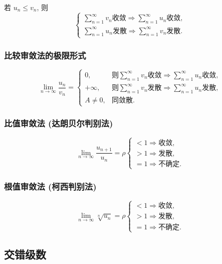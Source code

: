 若 $u_n \leq v_n$, 则
$$
    \begin{cases}
        \sum_{n=1}^\infty v_n \mbox{收敛} \Longrightarrow \sum_{n=1}^\infty u_n \mbox{收敛}, \\
        \sum_{n=1}^\infty u_n \mbox{发散} \Longrightarrow \sum_{n=1}^\infty v_n \mbox{发散}.
    \end{cases}
$$

\subsubsection{比较审敛法的极限形式}

$$
\lim _{n \to \infty} \frac{u_{n}}{v_{n}} =
    \begin{cases}
        0, & \mbox{则} \sum_{n=1}^\infty v_n \mbox{收敛} \Longrightarrow \sum_{n=1}^\infty u_n \mbox{收敛}, \\
        +\infty, & \mbox{则} \sum_{n=1}^\infty v_n \mbox{发散} \Longrightarrow \sum_{n=1}^\infty u_n \mbox{发散}, \\
        A \neq 0, & \mbox{同敛散}.
    \end{cases}
$$

\subsubsection{比值审敛法 (达朗贝尔判别法)}

$$
    \lim_{n\to\infty} \frac{u_{n+1}}{u_{n}} = \rho
    \begin{cases}
        < 1 \Longrightarrow \mbox{收敛}, \\
        > 1 \Longrightarrow \mbox{发散}, \\
        = 1 \Longrightarrow \mbox{不确定}.
    \end{cases}
$$

\subsubsection{根值审敛法 (柯西判别法)}

$$
    \lim_{n\to\infty} \sqrt[n]{u_n} = \rho
    \begin{cases}
        < 1 \Longrightarrow \mbox{收敛}, \\
        > 1 \Longrightarrow \mbox{发散}, \\
        = 1 \Longrightarrow \mbox{不确定}.
    \end{cases}
$$

\subsection{交错级数}

